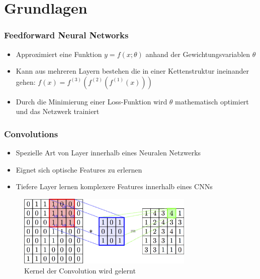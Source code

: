 \section{Grundlagen}
\begin{frame}
    \frametitle{Feedforward Neural Networks \cite[164]{Goodfellow-et-al-2016}}

    \begin{itemize}
        \item Approximiert eine Funktion $ y = f(x; \theta) $ anhand der Gewichtungsvariablen $ \theta $
        \item Kann aus mehreren Layern bestehen die in einer Kettenstruktur ineinander gehen: $ f(x) = f^{(3)}(f^{(2)}(f^{(1)}(x))) $
        \item Durch die Minimierung einer Loss-Funktion wird $ \theta $ mathematisch optimiert und das Netzwerk trainiert
    \end{itemize}
\end{frame}

\begin{frame}
    \frametitle{Convolutions}

    \begin{itemize}
        \item Spezielle Art von Layer innerhalb eines Neuralen Netzwerks
        \item Eignet sich optische Features zu erlernen
        \item Tiefere Layer lernen komplexere Features innerhalb eines CNNs
    \end{itemize}
    
    \begin{figure}[H]
        \centering
        \includegraphics[width=0.75\textwidth]{resources/content/convolution_croped.png}
        \caption{Kernel der Convolution wird gelernt \cite{convolution_img}}
        \label{img:convolution}
    \end{figure}
\end{frame}


